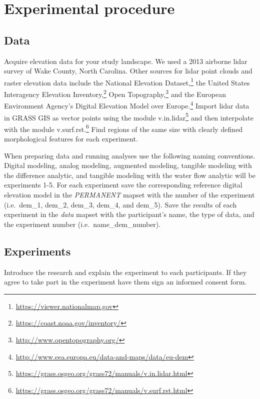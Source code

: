\documentclass[prodmode,acmtochi]{acmsmall} %
\begin{document}
\vfill
\pagebreak

\section{Experimental procedure}\label{appendix:procedure}

\subsection{Data}\label{appendix:data}
Acquire elevation data for your study landscape.
We used a 2013 airborne lidar survey of Wake County, North Carolina. 
Other sources for lidar point clouds and raster elevation data 
include the National Elevation Dataset,\footnote{
\url{https://viewer.nationalmap.gov}}
the United States Interagency Elevation Inventory,\footnote{
\url{https://coast.noaa.gov/inventory/}}
Open Topography,\footnote{
\url{http://www.opentopography.org/}}
and the European Environment Agency's
Digital Elevation Model over Europe.\footnote{
\url{http://www.eea.europa.eu/data-and-maps/data/eu-dem}}
%
Import lidar data in GRASS GIS as vector points using the module v.in.lidar\footnote{
\url{https://grass.osgeo.org/grass72/manuals/v.in.lidar.html}}
and then interpolate with the module v.surf.rst.\footnote{
\url{https://grass.osgeo.org/grass72/manuals/v.surf.rst.html}}
%
Find regions of the same size with clearly defined morphological features 
for each experiment. 

When preparing data and running analyses use the following naming conventions.
%
Digital modeling,
analog modeling,
augmented modeling,
tangible modeling with the difference analytic,
and tangible modeling with the water flow analytic
will be experiments 1-5.
%
For each experiment 
save the corresponding reference digital elevation model
in the \emph{PERMANENT} mapset 
with the number of the experiment 
(i.e.~dem{\_}1, 
dem{\_}2, 
dem{\_}3, 
dem{\_}4, 
and dem{\_}5).
%
Save the results of each experiment in the \emph{data} mapset
with the participant's name, the type of data, and the experiment number
(i.e.~name{\_}dem{\_}number).

\subsection{Experiments}\label{appendix:experiments}
Introduce the research and explain the experiment to each participants. 
If they agree to take part in the experiment have them sign an informed consent form.
%
\end{document}
